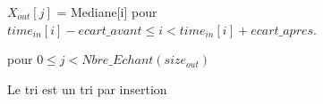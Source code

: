 $X_{out}[j]$ = Mediane[i] pour  $ time_{in}[i] - ecart\_avant \le i < time_{in}[i] + ecart\_apres$.

pour  $0 \le j < Nbre\_Echant(size_{out})$


Le tri est un tri par insertion



